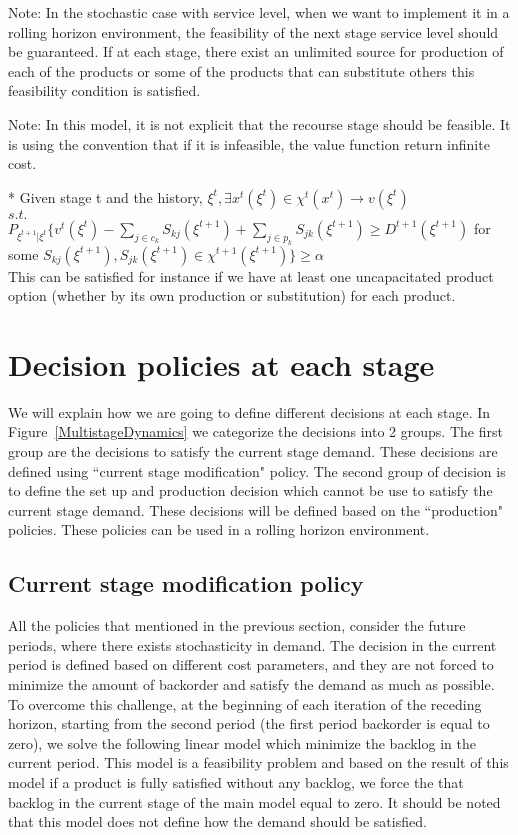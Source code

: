 \documentclass[10pt]{article}
\newcommand{\Es}{S} %
\newcommand{\cred}{\color{red!65!black}}
\begin{document}
{\cred Note:} In the stochastic case with service level, when we want to implement it in a rolling horizon environment, the feasibility of the next stage service level should be guaranteed. If at each stage, there exist an unlimited source for production of each of the products or some of the products that can substitute others this feasibility condition is satisfied.


{\cred Note: In this model, it is not explicit that the recourse stage should be feasible. It is using the convention that if it is infeasible, the value function return infinite cost.}


{\cred * Given stage t and the history, $\xi^t, \exists x^t(\xi^t) \in \chi^t(x^t) \rightarrow v(\xi^t)$\\
$s.t.$ \\
$P_{\xi^{t+1}|\xi^t}\{v^{t}(\xi^t)-\sum_{j\in c_k}\Es_{kj}(\xi^{t+1})+\sum_{j\in p_k}\Es_{jk}(\xi^{t+1}) \geq D^{t+1}(\xi^{t+1}) $ for some $\Es_{kj}(\xi^{t+1}) , \Es_{jk}(\xi^{t+1}) \in  \chi ^{t+1}(\xi^{t+1}) \} \geq \alpha$ \\
This can be satisfied for instance if we have at least one uncapacitated product option (whether by its own production or substitution) for each product.

}


\section{Decision policies at each stage}

We will explain how we are going to define different decisions at each stage. In Figure~\ref{MultistageDynamics} we categorize the decisions into 2 groups. The first group are the decisions to satisfy the current stage demand. These decisions are defined using ``current stage modification" policy. The second group of decision is to define the set up and production decision which cannot be use to satisfy the current stage demand. These decisions will be defined based on the ``production" policies. These policies can be used in a rolling horizon environment. 

 \subsection{Current stage modification policy}
All the policies that mentioned in the previous section, consider the future periods, where there exists stochasticity in demand. The decision in the current period is defined based on different cost parameters, and they are not forced to minimize the amount of backorder and satisfy the demand as much as possible. To overcome this challenge, at the beginning of each iteration of the receding horizon, starting from the second period (the first period backorder is equal to zero), we solve the following linear model which minimize the backlog in the current period. This model is a feasibility problem and based on the result of this model if a product is fully satisfied without any backlog, we force the that backlog in the current stage of the main model equal to zero. It should be noted that this model does not define how the demand should be satisfied. 
\end{document}

